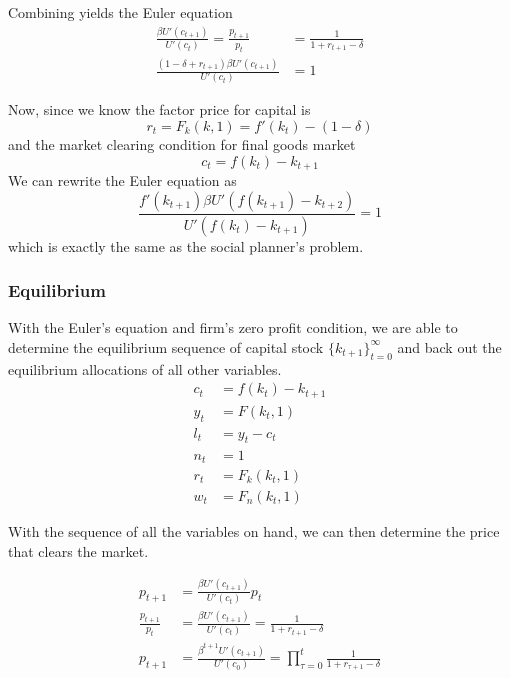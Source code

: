 \documentclass[twocolumn, fleqn]{article}
\begin{document}
	Combining yields the Euler equation
	\begin{align*}
	\frac{\beta U'(c_{t+1})}{U'(c_t)} = \frac{p_{t+1}}{p_t} &= \frac{1}{1 + r_{t+1} - \delta} \\
	\frac{(1 - \delta + r_{t+1}) \beta U'(c_{t+1})}{U'(c_t)} &= 1
	\end{align*}
	
	Now, since we know the factor price for capital is 
	\[r_t = F_k(k,1) = f'(k_t)-(1-\delta)\]
	and the market clearing condition for final goods market 
	\[c_t = f(k_t)-k_{t+1}\]
	We can rewrite the Euler equation as 
	\[
	\frac{f'(k_{t+1}) \beta U'(f(k_{t+1}) - k_{t+2})}{U'(f(k_t) - k_{t+1})} = 1
	\]
	which is exactly the same as the social planner's problem.
	
	
	\subsubsection{Equilibrium}
	With the Euler's equation and firm's zero profit condition, we are able to determine the equilibrium sequence of capital stock $\{k_{t+1}\}_{t=0}^{\infty}$ and back out the equilibrium allocations of all other variables.
	\begin{align*}
	c_t &= f(k_t) - k_{t+1} \\
	y_t &= F(k_t, 1) \\
	l_t &= y_t - c_t \\
	n_t &= 1 \\
	r_t &= F_k(k_t, 1) \\
	w_t &= F_n(k_t, 1)
	\end{align*}
	
	With the sequence of all the variables on hand, we can then determine the price that clears the market. 
	
	\begin{align*}
	p_{t+1} &= \frac{\beta U'(c_{t+1})}{U'(c_t)} p_t \\
	\frac{p_{t+1}}{p_t} &= \frac{\beta U'(c_{t+1})}{U'(c_t)} = \frac{1}{1 + r_{t+1} - \delta} \\
	p_{t+1} &= \frac{\beta^{t+1} U'(c_{t+1})}{U'(c_0)} = \prod_{\tau=0}^t \frac{1}{1 + r_{\tau+1} - \delta}
	\end{align*}
	
	
\end{document}
